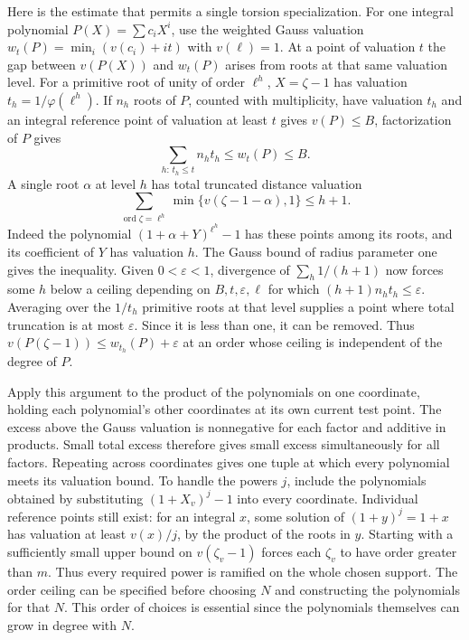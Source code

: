 Here is the estimate that permits a single torsion specialization. For one integral polynomial $P(X)=\sum c_i X^i$, use the weighted Gauss valuation $w_t(P)=\min_i(v(c_i)+it)$ with $v(\ell)=1$. At a point of valuation $t$ the gap between $v(P(X))$ and $w_t(P)$ arises from roots at that same valuation level. For a primitive root of unity of order $\ell^h$, $X=\zeta-1$ has valuation $t_h=1/\varphi(\ell^h)$. If $n_h$ roots of $P$, counted with multiplicity, have valuation $t_h$ and an integral reference point of valuation at least $t$ gives $v(P)\le B$, factorization of $P$ gives
\[
      \sum_{h:\,t_h\le t} n_h t_h\le w_t(P)\le B .
\]
A single root $\alpha$ at level $h$ has total truncated distance valuation
\[
 \sum_{\operatorname{ord}\zeta=\ell^h}
       \min\{v(\zeta-1-\alpha),1\}\le h+1 .
\]
Indeed the polynomial $(1+\alpha+Y)^{\ell^h}-1$ has these points among its roots, and its coefficient of $Y$ has valuation $h$. The Gauss bound of radius parameter one gives the inequality. Given $0<\varepsilon<1$, divergence of $\sum_h1/(h+1)$ now forces some $h$ below a ceiling depending on $B,t,\varepsilon,\ell$ for which $(h+1)n_h t_h\le\varepsilon$. Averaging over the $1/t_h$ primitive roots at that level supplies a point where total truncation is at most $\varepsilon$. Since it is less than one, it can be removed. Thus $v(P(\zeta-1))\le w_{t_h}(P)+\varepsilon$ at an order whose ceiling is independent of the degree of $P$.

Apply this argument to the product of the polynomials on one coordinate, holding each polynomial's other coordinates at its own current test point. The excess above the Gauss valuation is nonnegative for each factor and additive in products. Small total excess therefore gives small excess simultaneously for all factors. Repeating across coordinates gives one tuple at which every polynomial meets its valuation bound. To handle the powers $j$, include the polynomials obtained by substituting $(1+X_v)^j-1$ into every coordinate. Individual reference points still exist: for an integral $x$, some solution of $(1+y)^j=1+x$ has valuation at least $v(x)/j$, by the product of the roots in $y$. Starting with a sufficiently small upper bound on $v(\zeta_v-1)$ forces each $\zeta_v$ to have order greater than $m$. Thus every required power is ramified on the whole chosen support. The order ceiling can be specified before choosing $N$ and constructing the polynomials for that $N$. This order of choices is essential since the polynomials themselves can grow in degree with $N$.

